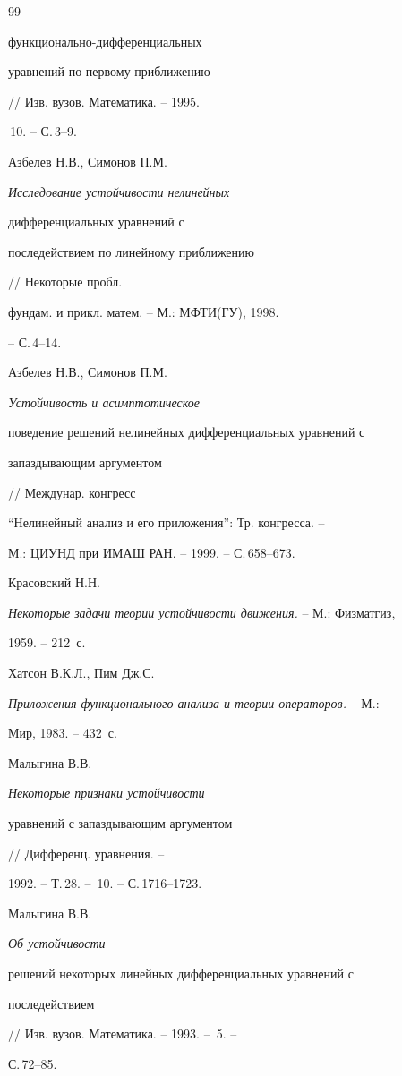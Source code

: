 \begin{thebibliography}{99}
{функционально-дифференциальных


уравнений по первому приближению} // Изв. вузов. Математика. -- 1995.


\No\,10. -- С.\,3--9.




Азбелев Н.В., Симонов П.М. {\em Исследование устойчивости нелинейных


дифференциальных уравнений с


последействием по линейному приближению} // Некоторые пробл.


фундам. и прикл. матем. -- М.: МФТИ(ГУ), 1998.


-- С.\,4--14.




Азбелев Н.В., Симонов П.М. {\em Устойчивость и асимптотическое


поведение решений нелинейных дифференциальных уравнений с


запаздывающим аргументом} // Междунар. конгресс


``Нелинейный анализ и его приложения'': Тр. конгресса. --


М.: ЦИУНД при ИМАШ РАН. -- 1999. -- С.\,658--673.




Красовский Н.Н.


{\em Некоторые задачи теории устойчивости движения.} -- М.: Физматгиз,


1959. -- 212~с.




Хатсон В.К.Л., Пим Дж.С.


{\em Приложения функционального анализа и теории операторов.} -- М.:


Мир, 1983. -- 432~с.




Малыгина В.В. {\em Некоторые признаки устойчивости


уравнений с запаздывающим аргументом} // Дифференц. уравнения. --


1992. -- Т.\,28. -- \No\,10. -- С.\,1716--1723.




Малыгина В.В. {\em Об устойчивости


решений некоторых линейных дифференциальных уравнений с


последействием} // Изв. вузов. Математика. -- 1993. -- \No\,5. --


С.\,72--85.





\end{thebibliography}
